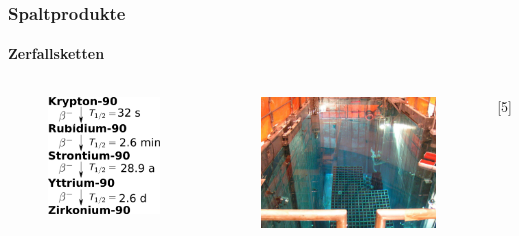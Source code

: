 \documentclass{beamer}[9pt]
\begin{document}
\begin{frame}
\frametitle{Spaltprodukte}
\framesubtitle{Zerfallsketten}
\begin{columns}
\begin{figure}
\includegraphics[scale=.2]{zerfallsreihe.png}
\end{figure}

\begin{figure}
\includegraphics[scale=.15]{abklingbecken.jpg}
\end{figure}
\hspace{.5\columnwidth}[5]
\end{columns}
\end{frame}
\end{document}
